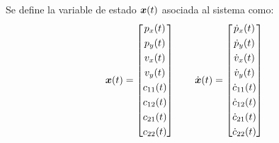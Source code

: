	Se define la variable de estado $\boldsymbol{x}(t)$ asociada al sistema como:
		\begin{equation*}
			\vect{x}(t) = \begin{bmatrix} {p_x}(t) \\[0.3em] p_y(t) \\[0.3em] {v_x}(t) \\[0.3em] v_y(t) \\[0.3em] c_{11}(t) \\[0.3em] c_{12}(t) \\[0.3em] c_{21}(t) \\[0.3em] c_{22}(t) \end{bmatrix} \qquad%
			\dot{\vect{x}}(t) = \begin{bmatrix} {\dot{p}_x}(t) \\[0.3em] \dot{p}_y(t) \\[0.3em] {\dot{v}_x}(t) \\[0.3em] \dot{v}_y(t) \\[0.3em] \dot{c}_{11}(t) \\[0.3em] \dot{c}_{12}(t) \\[0.3em] \dot{c}_{21}(t) \\[0.3em] \dot{c}_{22}(t) \end{bmatrix}
		\end{equation*}

